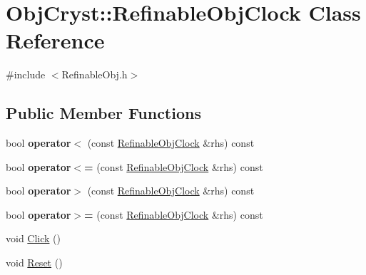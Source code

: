 \hypertarget{class_obj_cryst_1_1_refinable_obj_clock}{}\section{Obj\+Cryst\+::Refinable\+Obj\+Clock Class Reference}
\label{class_obj_cryst_1_1_refinable_obj_clock}


{\ttfamily \#include $<$Refinable\+Obj.\+h$>$}

\subsection*{Public Member Functions}
\begin{DoxyCompactItemize}
\item 
\mbox{\label{class_obj_cryst_1_1_refinable_obj_clock_a34e4b2f7dddbd7ea980bff822df92c3c}} 
bool {\bfseries operator$<$} (const \mbox{\hyperlink{class_obj_cryst_1_1_refinable_obj_clock}{Refinable\+Obj\+Clock}} \&rhs) const
\item 
\mbox{\label{class_obj_cryst_1_1_refinable_obj_clock_ae2efcb0736b00e6777df512426ef5f7d}} 
bool {\bfseries operator$<$=} (const \mbox{\hyperlink{class_obj_cryst_1_1_refinable_obj_clock}{Refinable\+Obj\+Clock}} \&rhs) const
\item 
\mbox{\label{class_obj_cryst_1_1_refinable_obj_clock_aa0d5411c9cb143a5847f5e2d3c9e3699}} 
bool {\bfseries operator$>$} (const \mbox{\hyperlink{class_obj_cryst_1_1_refinable_obj_clock}{Refinable\+Obj\+Clock}} \&rhs) const
\item 
\mbox{\label{class_obj_cryst_1_1_refinable_obj_clock_a707d24113d53cfbf833192555bd91cdb}} 
bool {\bfseries operator$>$=} (const \mbox{\hyperlink{class_obj_cryst_1_1_refinable_obj_clock}{Refinable\+Obj\+Clock}} \&rhs) const
\item 
void \mbox{\hyperlink{class_obj_cryst_1_1_refinable_obj_clock_a980b7dc70decc75c58eba0a55d73fc6d}{Click}} ()
\item 
\mbox{\label{class_obj_cryst_1_1_refinable_obj_clock_a0b0c15d465647c470eb120d6d6ee54d6}} 
void \mbox{\hyperlink{class_obj_cryst_1_1_refinable_obj_clock_a0b0c15d465647c470eb120d6d6ee54d6}{Reset}} ()

\end{DoxyCompactItemize}
